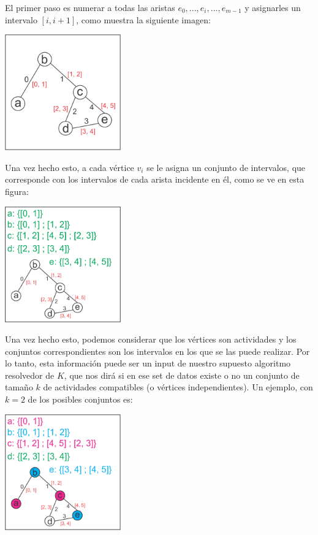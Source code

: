 \documentclass{article}
\newcommand\tab[1][0.5cm]{\hspace*{#1}}
\begin{document}
\begin{enumerate}
            \tab El primer paso es numerar a todas las aristas $e_{0}, ..., e_{i}, ..., e_{m-1}$ y asignarles un intervalo
            $[i, i+1]$, como muestra la siguiente imagen:

            \begin{center}
                \includegraphics[width=5cm, height=5cm]{images/p2naming} %
            \end{center}

            \tab Una vez hecho esto, a cada vértice $v_{i}$ se le asigna un conjunto de intervalos, que corresponde con
            los intervalos de cada arista incidente en él, como se ve en esta figura:

            \begin{center}
                \includegraphics[width=5cm, height=5cm]{images/p2vertices} %
            \end{center}

            \tab Una vez hecho esto, podemos considerar que los vértices son actividades y los conjuntos correspondientes
            son los intervalos en los que se las puede realizar. Por lo tanto, esta información puede ser un input de
            nuestro supuesto algoritmo resolvedor de $K$, que nos dirá si en ese set de datos existe o no un conjunto
            de tamaño $k$ de actividades compatibles (o vértices independientes). Un ejemplo, con $k = 2$ de los posibles
            conjuntos es:

            \begin{center}
                \includegraphics[width=5cm, height=5cm]{images/p2example} %
            \end{center}


\end{enumerate}
\end{document}
